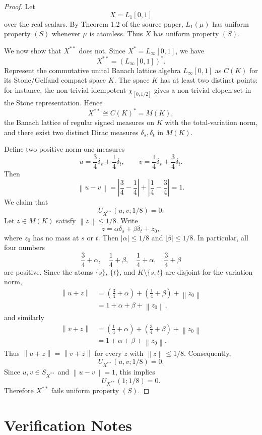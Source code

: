 \documentclass[11pt]{article}
\newcommand{\norm}[1]{\left\lVert #1 \right\rVert}
\begin{document}
\begin{proof}
Let
\[
  X=L_1[0,1]
\]
over the real scalars. By Theorem 1.2 of the source paper,
$L_1(\mu)$ has uniform property $(S)$ whenever $\mu$ is atomless.
Thus $X$ has uniform property $(S)$.

We now show that $X^{**}$ does not. Since $X^*=L_\infty[0,1]$, we
have
\[
  X^{**}=(L_\infty[0,1])^*.
\]
Represent the commutative unital Banach lattice algebra
$L_\infty[0,1]$ as $C(K)$ for its Stone/Gelfand compact space $K$.
The space $K$ has at least two distinct points: for instance, the
non-trivial idempotent $\chi_{[0,1/2]}$ gives a non-trivial clopen
set in the Stone representation. Hence
\[
  X^{**}\cong C(K)^*=M(K),
\]
the Banach lattice of regular signed measures on $K$ with the
total-variation norm, and there exist two distinct Dirac measures
$\delta_s,\delta_t$ in $M(K)$.

Define two positive norm-one measures
\[
  u=\frac34\delta_s+\frac14\delta_t,
  \qquad
  v=\frac14\delta_s+\frac34\delta_t.
\]
Then
\[
  \norm{u-v}
  =
  \left|\frac34-\frac14\right|
  +
  \left|\frac14-\frac34\right|
  =
  1.
\]
We claim that
\[
  U_{X^{**}}(u,v;1/8)=0.
\]
Let $z\in M(K)$ satisfy $\norm{z}\le 1/8$. Write
\[
  z=\alpha\delta_s+\beta\delta_t+z_0,
\]
where $z_0$ has no mass at $s$ or $t$. Then
$|\alpha|\le 1/8$ and $|\beta|\le 1/8$. In particular, all four
numbers
\[
  \frac34+\alpha,\quad \frac14+\beta,\quad
  \frac14+\alpha,\quad \frac34+\beta
\]
are positive. Since the atoms $\{s\}$, $\{t\}$, and
$K\setminus\{s,t\}$ are disjoint for the variation norm,
\[
\begin{aligned}
  \norm{u+z}
  &=
  \left(\frac34+\alpha\right)
  +
  \left(\frac14+\beta\right)
  +
  \norm{z_0}       \\
  &=1+\alpha+\beta+\norm{z_0},
\end{aligned}
\]
and similarly
\[
\begin{aligned}
  \norm{v+z}
  &=
  \left(\frac14+\alpha\right)
  +
  \left(\frac34+\beta\right)
  +
  \norm{z_0}       \\
  &=1+\alpha+\beta+\norm{z_0}.
\end{aligned}
\]
Thus $\norm{u+z}=\norm{v+z}$ for every $z$ with $\norm{z}\le 1/8$.
Consequently,
\[
  U_{X^{**}}(u,v;1/8)=0.
\]
Since $u,v\in S_{X^{**}}$ and $\norm{u-v}=1$, this implies
\[
  U_{X^{**}}(1;1/8)=0.
\]
Therefore $X^{**}$ fails uniform property $(S)$.
\end{proof}

\section*{Verification Notes}
\end{document}
